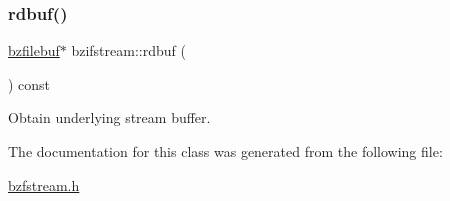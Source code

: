 \subsubsection{\texorpdfstring{rdbuf()}{rdbuf()}}
{\footnotesize\ttfamily \hyperlink{classbzfilebuf}{bzfilebuf}$\ast$ bzifstream\+::rdbuf (\begin{DoxyParamCaption}{ }\end{DoxyParamCaption}) const\hspace{0.3cm}{\ttfamily [inline]}}

Obtain underlying stream buffer. 

The documentation for this class was generated from the following file\+:\begin{DoxyCompactItemize}
\item 
\hyperlink{bzfstream_8h}{bzfstream.\+h}\end{DoxyCompactItemize}
